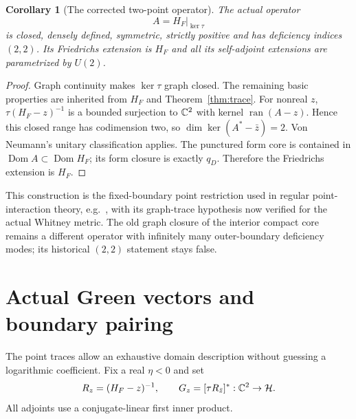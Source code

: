\documentclass[11pt]{article}
\newtheorem{corollary}[theorem]{Corollary}
\theoremstyle{remark}\newtheorem{remark}[theorem]{Remark}
\newcommand{\Dom}{\operatorname{Dom}}\newcommand{\dd}{\,d}
\begin{document}
\begin{corollary}[The corrected two-point operator]\label{cor:indices}
The actual operator
\[
 A=H_F|_{\ker\tau}
\]
is closed, densely defined, symmetric, strictly positive and has deficiency
indices $(2,2)$. Its Friedrichs extension is $H_F$ and all its self-adjoint
extensions are parametrized by $U(2)$.
\end{corollary}
\begin{proof}
Graph continuity makes $\ker\tau$ graph closed. The remaining basic properties
are inherited from $H_F$ and Theorem~\ref{thm:trace}. For nonreal $z$,
$\tau(H_F-z)^{-1}$ is a bounded surjection to $\mathbb C^2$ with kernel
$\operatorname{ran}(A-z)$. Hence this closed range has codimension two,
so $\dim\ker(A^*-\bar z)=2$. Von Neumann's unitary classification applies.
The punctured form core is contained in $\Dom A\subset\Dom H_F$;
its form closure is exactly $q_D$. Therefore the Friedrichs extension is $H_F$.
\end{proof}
This construction is the fixed-boundary point restriction used in regular
point-interaction theory, e.g.\ \cite{point}, with its graph-trace hypothesis
now verified for the actual Whitney metric. The old graph closure of the
interior compact core remains a different operator with infinitely many
outer-boundary deficiency modes; its historical $(2,2)$ statement stays false.

\section{Actual Green vectors and boundary pairing}\label{sec:green}
The point traces allow an exhaustive domain description without guessing a
logarithmic coefficient. Fix a real $\eta<0$ and set
\[
 R_z=(H_F-z)^{-1},\qquad G_z=[\tau R_{\bar z}]^*:\mathbb C^2\to\mathcal H.
\]
All adjoints use a conjugate-linear first inner product.
\end{document}
